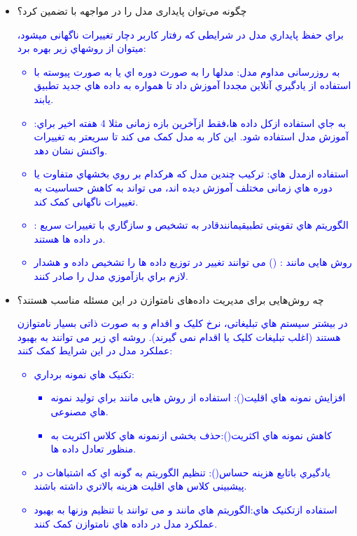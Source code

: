 \documentclass[12pt]{article}
\begin{document}
\begin{enumerate}
    \begin{itemize}
        \item چگونه می‌توان پایداری مدل را در مواجهه با  تضمین کرد؟
        \textcolor{blue}{
        براي حفظ پایداري مدل در شرایطی که رفتار کاربر دچار تغییرات ناگهانی میشود، میتوان از روشهاي زیر بهره برد:
        \begin{itemize}
            \item به روزرسانی مداوم مدل: مدلها را به صورت دوره اي یا به صورت پیوسته با استفاده از یادگیري آنلاین مجددا آموزش داد تا همواره
            به داده هاي جدید تطبیق یابند.
            \item {}:به جاي استفاده ازکل داده ها،فقط ازآخرین بازه زمانی مثلا 4 هفته
            اخیر براي آموزش مدل استفاده شود. این کار به مدل کمک می کند تا سریعتر به تغییرات واکنش نشان دهد.
            \item  استفاده ازمدل هاي: ترکیب چندین مدل که هرکدام بر روي بخشهاي متفاوت یا دوره هاي زمانی مختلف آموزش دیده اند،
            می تواند به کاهش حساسیت به تغییرات ناگهانی کمک کند.
            \item {}:
            الگوریتم هاي تقویتی تطبیقیمانندقادر
            به تشخیص و سازگاري با تغییرات سریع در داده ها هستند.
            \item {} روش هایی مانند :  
            () می توانند تغییر در توزیع داده ها را تشخیص داده و هشدار لازم براي بازآموزي مدل را صادر کنند.
        \end{itemize}}
        
        \item چه روش‌هایی برای مدیریت داده‌های نامتوازن در این مسئله مناسب هستند؟
        
        \textcolor{blue}{
        در بیشتر سیستم هاي تبلیغاتی، نرخ کلیک و اقدام  و  به صورت ذاتی بسیار نامتوازن هستند (اغلب تبلیغات کلیک یا اقدام نمی گیرند). روشه اي زیر می توانند به بهبود عملکرد مدل در این شرایط کمک کنند:
        \begin{itemize}
            \item تکنیک هاي نمونه برداري:
            \begin{itemize}
                \item  افزایش نمونه هاي اقلیت():
                استفاده از روش هایی مانند  براي تولید نمونه هاي مصنوعی.
                \item کاهش نمونه هاي اکثریت():حذف بخشی ازنمونه هاي کلاس اکثریت به منظور
                تعادل داده ها. 
            \end{itemize}
            \item یادگیري باتابع هزینه حساس():
            تنظیم الگوریتم به گونه اي که اشتباهات در پیشبینی کلاس هاي اقلیت هزینه بالاتري داشته باشند.
            \item استفاده ازتکنیک هاي:الگوریتم هاي مانند  و  می توانند با تنظیم وزنها به بهبود عملکرد مدل در داده هاي نامتوازن کمک کنند.
        \end{itemize}}
        

\end{itemize}
\end{enumerate}
\end{document}
